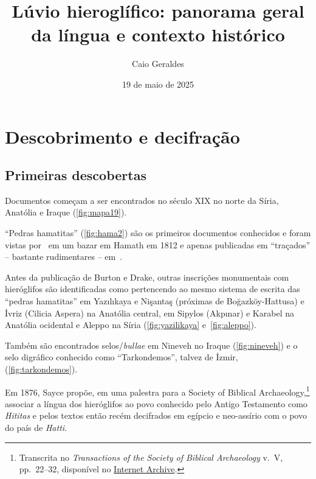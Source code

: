 \documentclass[article]{lúvio}
\title{Lúvio hieroglífico: panorama geral da língua e contexto histórico}
\author{Caio Geraldes}
\date{19 de maio de 2025}
\begin{document}
\frontmatter

\mainmatter%

\maketitle

\chapter{Descobrimento e decifração}

\section{Primeiras descobertas}

\begin{compactitem}
	\item Documentos começam a ser encontrados no século XIX no norte da Síria,
	Anatólia e Iraque (\autoref{fig:mapa19}).
	\begin{compactitem}
		\item ``Pedras hamatitas'' (\autoref{fig:hama2}) são os primeiros documentos
		conhecidos e foram vistas por~\textcite[146--7]{Burckhardt1822} em um bazar
		em Hamath em 1812 e apenas publicadas em ``traçados'' -- bastante
		rudimentares -- em~\textcite[333--60]{UnexploredSyriaI}.
		\item Antes da publicação de Burton e Drake, outras inscrições monumentais
		com hieróglifos são identificadas como pertencendo ao mesmo sistema de
		escrita das ``pedras hamatitas'' em Yazılıkaya e Nişantaş (próximas de
		Boğazköy\hyp{}Hattusa) e İvriz (Cilicia Aspera) na Anatólia central, em
		Sipylos (Akpınar) e Karabel na Anatólia ocidental e Aleppo na Síria
		(\autoref{fig:yazilikaya} e~\autoref{fig:aleppo}).
		\item Também são encontrados selos\slash{}\emph{bullae} em Nineveh no
		Iraque (\autoref{fig:nineveh}) e o selo digráfico conhecido como
		``Tarkondemos'', talvez de İzmir, (\autoref{fig:tarkondemos}).
	\end{compactitem}
	\item Em 1876, Sayce propõe, em uma palestra para a Society of Biblical
	Archaeology,\footnote{Transcrita no \emph{Transactions of the Society of
			Biblical Archaeology} v.\ V, pp.\ 22--32, disponível no
		\href{https://archive.org/details/transactionssoc04nashgoog}{Internet
			Archive}.} associar a língua dos hieróglifos ao povo conhecido pelo Antigo
	Testamento como \emph{Hititas} e pelos textos então recém decifrados em
	egípcio e neo\hyp{}assírio com o povo do país de \emph{Hatti}.
\end{compactitem}
\end{document}
